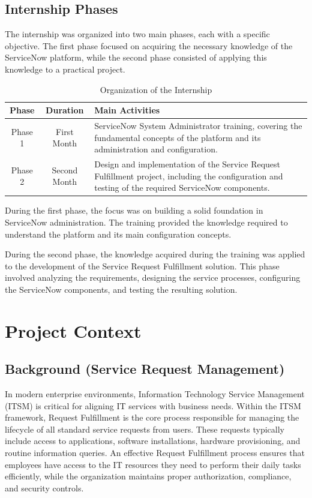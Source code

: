 \documentclass[12pt,a4paper]{report}
\begin{document}
\subsection{Internship Phases}

The internship was organized into two main phases, each with a specific
objective. The first phase focused on acquiring the necessary knowledge of
the ServiceNow platform, while the second phase consisted of applying this
knowledge to a practical project.

\begin{table}[H]
    \centering
    \begin{tabular}{|c|c|p{8cm}|}
        \hline
        \textbf{Phase} & \textbf{Duration} & \textbf{Main Activities} \\ \hline
        
        Phase 1 & First Month &
        ServiceNow System Administrator training, covering the fundamental
        concepts of the platform and its administration and configuration. \\ \hline
        
        Phase 2 & Second Month &
        Design and implementation of the Service Request Fulfillment project,
        including the configuration and testing of the required ServiceNow
        components. \\ \hline
    \end{tabular}
    \caption{Organization of the Internship}
    \label{tab:internship-phases}
\end{table}

During the first phase, the focus was on building a solid foundation in
ServiceNow administration. The training provided the knowledge required to
understand the platform and its main configuration concepts.

During the second phase, the knowledge acquired during the training was applied
to the development of the Service Request Fulfillment solution. This phase
involved analyzing the requirements, designing the service processes,
configuring the ServiceNow components, and testing the resulting solution.


\section{Project Context}

\subsection{Background (Service Request Management)}
In modern enterprise environments, Information Technology Service Management (ITSM) is critical 
for aligning  IT services with business needs. Within the ITSM framework, Request Fulfillment is 
the core process responsible for managing the lifecycle of all standard service requests from users. 
These requests typically include access to applications, software installations, hardware provisioning, 
and routine information queries. An effective Request Fulfillment process ensures that employees 
have access to the IT resources they need to perform their daily tasks efficiently, while the 
organization maintains proper authorization, compliance, and security controls.
\end{document}
